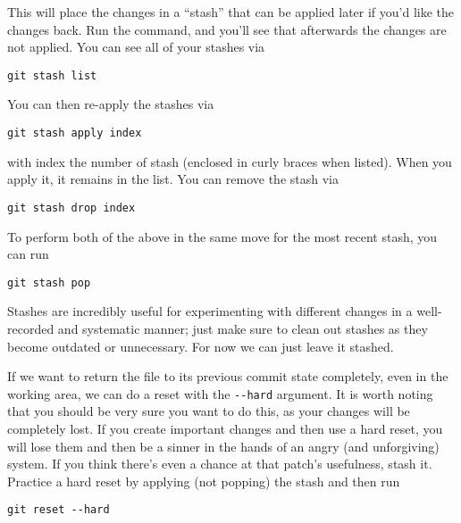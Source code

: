 \par{
This will place the changes in a ``stash'' that can be applied later if you'd
like the changes back. Run the command, and you'll see that afterwards the
changes are not applied. You can see all of your stashes via
}

\begin{verbatim}
git stash list
\end{verbatim}

\par{
You can then re-apply the stashes via
}

\begin{verbatim}
git stash apply index
\end{verbatim}

\par{
with index the number of stash (enclosed in curly braces when listed). 
When you apply it, it remains in the list. You can remove the stash via
}

\begin{verbatim}
git stash drop index
\end{verbatim}

\par{
To perform both of the above in the same move for the most recent stash, you
can run
}

\begin{verbatim}
git stash pop
\end{verbatim}

\par{
Stashes are incredibly useful for experimenting with different changes in a
well-recorded and systematic manner; just make sure to clean out stashes as
they become outdated or unnecessary. For now we can just leave it stashed.
}

\par{
If we want to return the file to its previous commit state completely, even in
the working area, we can do a reset with the \verb+--hard+ argument. It is
worth noting that you should be very sure you want to do this, as your changes
will be completely lost. If you create important changes and then use a hard
reset, you will lose them and then be a sinner in the hands of an angry (and
unforgiving) system. If you think there's even a chance at that patch's
usefulness, stash it. Practice a hard reset by applying (not popping) the
stash and then run
}

\begin{verbatim}
git reset --hard
\end{verbatim}

